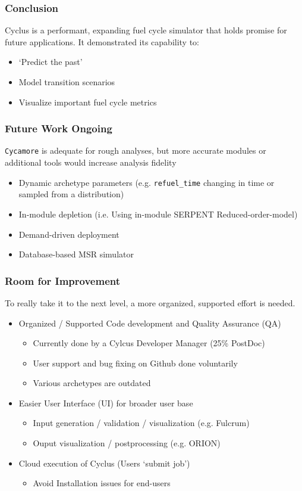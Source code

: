 \begin{frame}
    \frametitle{Conclusion}
    Cyclus is a performant, expanding fuel cycle simulator that holds promise for future applications. It demonstrated its capability to:
    \begin{itemize}
        \item `Predict the past'
        \item Model transition scenarios
        \item Visualize important fuel cycle metrics
    \end{itemize}
\end{frame}

\begin{frame}
    \frametitle{Future Work Ongoing}
    \texttt{Cycamore} is adequate for rough analyses, but more accurate
    modules or additional tools would increase analysis fidelity
    \begin{itemize}
        \item Dynamic archetype parameters (e.g. \texttt{refuel\_time}
                changing in time or sampled from a distribution)
        \item In-module depletion (i.e. Using in-module SERPENT Reduced-order-model)
        \item Demand-driven deployment \footnotemark
        \item Database-based MSR simulator
    \end{itemize}
\end{frame}


\begin{frame}
    \frametitle{Room for Improvement}
    To really take it to the next level, a more organized, supported
    effort is needed.
    \begin{itemize}
        \item Organized / Supported Code development and Quality Assurance (QA)
        \begin{itemize}
            \item Currently done by a Cylcus Developer Manager (25\% PostDoc)
            \item User support and bug fixing on Github done voluntarily
            \item Various archetypes are outdated
        \end{itemize}
        \item Easier User Interface (UI) for broader user base
        \begin{itemize}
            \item Input generation / validation / visualization (e.g. Fulcrum)
            \item Ouput visualization / postprocessing (e.g. ORION)
        \end{itemize}
        \item Cloud execution of Cyclus (Users `submit job')
        \begin{itemize}
            \item Avoid Installation issues for end-users
        \end{itemize}
    \end{itemize}
\end{frame}



